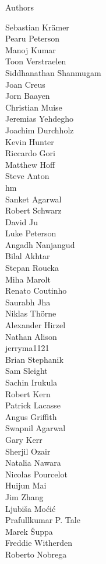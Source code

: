 \documentclass[xcolor=svgnames]{beamer}
\begin{document}
\begin{frame}{Authors}
\begin{multicols}{5}
Sebastian Krämer\\
Pearu Peterson\\
Manoj Kumar\\
Toon Verstraelen\\
Siddhanathan Shanmugam\\
Joan Creus\\
Jorn Baayen\\
Christian Muise\\
Jeremias Yehdegho\\
Joachim Durchholz\\
Kevin Hunter\\
Riccardo Gori\\
Matthew Hoff\\
Steve Anton\\
hm\\
Sanket Agarwal\\
Robert Schwarz\\
David Ju\\
Luke Peterson\\
Angadh Nanjangud\\
Bilal Akhtar\\
Stepan Roucka\\
Miha Marolt\\
Renato Coutinho\\
Saurabh Jha\\
Niklas Thörne\\
Alexander Hirzel\\
Nathan Alison\\
jerryma1121\\
Brian Stephanik\\
Sam Sleight\\
Sachin Irukula\\
Robert Kern\\
Patrick Lacasse\\
Angus Griffith\\
Swapnil Agarwal\\
Gary Kerr\\
Sherjil Ozair\\
Natalia Nawara\\
Nicolas Pourcelot\\
Huijun Mai\\
Jim Zhang\\
Ljubiša Moćić\\
Prafullkumar P. Tale\\
Marek Šuppa\\
Freddie Witherden\\
Roberto Nobrega\\

\end{multicols}
\end{frame}
\end{document}
